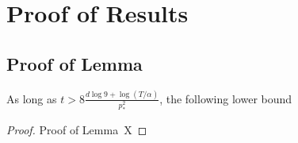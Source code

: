 \documentclass[opre,nonblindrev]{informs}
\begin{document}



\newpage

\APPENDICES

\section{Proof of Results}

\subsection{Proof of Lemma}

\begin{lemma}
	\label{lem:A1}
    As long as $t>8 \frac{d \log 9 +\log (T/\alpha)}{p_{*}^2}$, the following lower bound
\end{lemma}

\begin{proof}{Proof of Lemma~X}
\end{proof}
\end{document}

